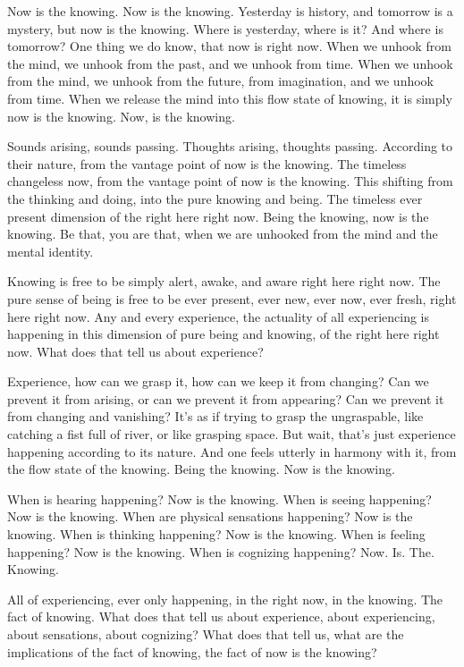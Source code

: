\documentclass[12pt,openany]{book}
\begin{document}
Now is the knowing. Now is the knowing. Yesterday is history, and tomorrow is a mystery, but now is the knowing. Where is yesterday, where is it? And where is tomorrow? One thing we do know, that now is right now. When we unhook from the mind, we unhook from the past, and we unhook from time. When we unhook from the mind, we unhook from the future, from imagination, and we unhook from time. When we release the mind into this flow state of knowing, it is simply now is the knowing. Now, is the knowing.

Sounds arising, sounds passing. Thoughts arising, thoughts passing. According to their nature, from the vantage point of now is the knowing. The timeless changeless now, from the vantage point of now is the knowing. This shifting from the thinking and doing, into the pure knowing and being. The timeless ever present dimension of the right here right now. Being the knowing, now is the knowing. Be that, you are that, when we are unhooked from the mind and the mental identity.

Knowing is free to be simply alert, awake, and aware right here right now. The pure sense of being is free to be ever present, ever new, ever now, ever fresh, right here right now. Any and every experience, the actuality of all experiencing is happening in this dimension of pure being and knowing, of the right here right now. What does that tell us about experience?

Experience, how can we grasp it, how can we keep it from changing? Can we prevent it from arising, or can we prevent it from appearing? Can we prevent it from changing and vanishing? It's as if trying to grasp the ungraspable, like catching a fist full of river, or like grasping space. But wait, that’s just experience happening according to its nature. And one feels utterly in harmony with it, from the flow state of the knowing. Being the knowing. Now is the knowing.

When is hearing happening? Now is the knowing. When is seeing happening? Now is the knowing. When are physical sensations happening? Now is the knowing. When is thinking happening? Now is the knowing. When is feeling happening? Now is the knowing. When is cognizing happening? Now. Is. The. Knowing.

All of experiencing, ever only happening, in the right now, in the knowing. The fact of knowing. What does that tell us about experience, about experiencing, about sensations, about cognizing? What does that tell us, what are the implications of the fact of knowing, the fact of now is the knowing?
\end{document}
